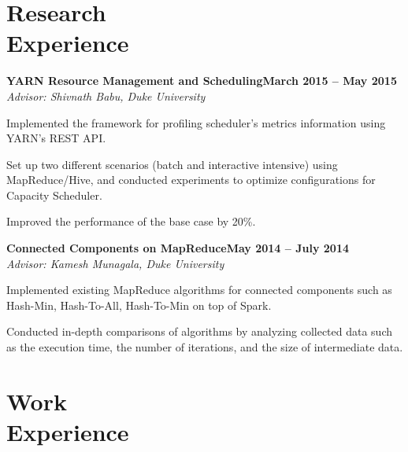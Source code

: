 \documentclass[10pt,margin,line]{resume}
\begin{document}
\begin{resume}
\section{\mysidestyle Research\\Experience}
\textbf{YARN Resource Management and Scheduling}\hfill \textbf{March 2015 -- May 2015} \vspace{0mm}\\\vspace{0mm}%
\textsl{Advisor: Shivnath Babu, Duke University}
\vspace{-3mm}\\\vspace{-1mm}%
\begin{list3}
    \item Implemented the framework for profiling scheduler's metrics information using YARN's REST API.
    \item Set up two different scenarios (batch and interactive intensive) using MapReduce/Hive, and conducted experiments to optimize configurations for Capacity Scheduler.
    \item Improved the performance of the base case by 20\%.
\end{list3}

\textbf{Connected Components on MapReduce}\hfill \textbf{May 2014 -- July 2014} \vspace{0mm}\\\vspace{0mm}%
\textsl{Advisor: Kamesh Munagala, Duke University}
\vspace{-3mm}\\\vspace{-1mm}%
\begin{list3}
    \item Implemented existing MapReduce algorithms for connected components such as Hash-Min, Hash-To-All, Hash-To-Min on top of Spark.
    \item Conducted in-depth comparisons of algorithms by analyzing collected data such as the execution time, the number of iterations, and the size of intermediate data.
\end{list3}


\section{\mysidestyle Work\\Experience}


\end{resume}
\end{document}
